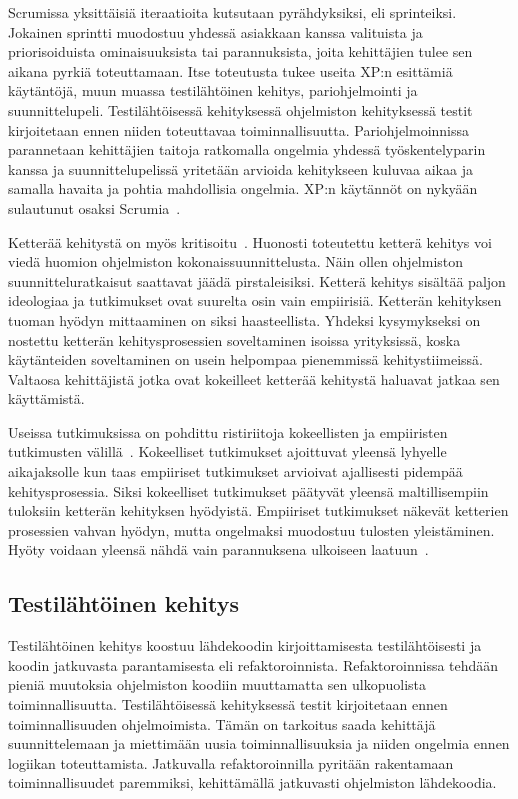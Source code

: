 \documentclass[finnish]{../tktltiki2}
\theoremstyle{definition}
\theoremstyle{remark}
\begin{document}
    Scrumissa yksittäisiä iteraatioita kutsutaan pyrähdyksiksi, eli sprinteiksi. Jokainen sprintti muodostuu yhdessä 
asiakkaan kanssa valituista ja priorisoiduista ominaisuuksista tai parannuksista, joita kehittäjien tulee sen aikana 
pyrkiä toteuttamaan. Itse toteutusta tukee useita XP:n esittämiä käytäntöjä, muun muassa testilähtöinen kehitys, 
pariohjelmointi ja suunnittelupeli. Testilähtöisessä kehityksessä ohjelmiston kehityksessä testit kirjoitetaan ennen 
niiden toteuttavaa toiminnallisuutta. Pariohjelmoinnissa parannetaan kehittäjien taitoja ratkomalla ongelmia yhdessä 
työskentelyparin kanssa ja suunnittelupelissä yritetään arvioida kehitykseen kuluvaa aikaa ja samalla havaita ja pohtia 
mahdollisia ongelmia. XP:n käytännöt on nykyään sulautunut osaksi Scrumia~\cite{Kn07}.

    Ketterää kehitystä on myös kritisoitu~\cite{DD08}. Huonosti toteutettu ketterä kehitys voi viedä huomion ohjelmiston 
kokonaissuunnittelusta. Näin ollen ohjelmiston suunnitteluratkaisut saattavat jäädä pirstaleisiksi. Ketterä kehitys 
sisältää paljon ideologiaa ja tutkimukset ovat suurelta osin vain empiirisiä. Ketterän kehityksen tuoman hyödyn 
mittaaminen on siksi haasteellista. Yhdeksi kysymykseksi on nostettu ketterän kehitysprosessien soveltaminen isoissa 
yrityksissä, koska käytänteiden soveltaminen on usein helpompaa pienemmissä kehitystiimeissä. Valtaosa kehittäjistä 
jotka ovat kokeilleet ketterää kehitystä haluavat jatkaa sen käyttämistä.

    Useissa tutkimuksissa on pohdittu ristiriitoja kokeellisten ja empiiristen tutkimusten välillä~\cite{DD08, SS10}. 
Kokeelliset tutkimukset ajoittuvat yleensä lyhyelle aikajaksolle kun taas empiiriset tutkimukset arvioivat ajallisesti 
pidempää kehitysprosessia. Siksi kokeelliset tutkimukset päätyvät yleensä maltillisempiin tuloksiin ketterän kehityksen 
hyödyistä. Empiiriset tutkimukset näkevät ketterien prosessien vahvan hyödyn, mutta ongelmaksi muodostuu tulosten 
yleistäminen. Hyöty voidaan yleensä nähdä vain parannuksena ulkoiseen laatuun~\cite{SS10}.

\subsection{Testilähtöinen kehitys}

Testilähtöinen kehitys koostuu lähdekoodin kirjoittamisesta testilähtöisesti ja koodin jatkuvasta parantamisesta eli 
refaktoroinnista. Refaktoroinnissa tehdään pieniä muutoksia ohjelmiston koodiin muuttamatta sen ulkopuolista 
toiminnallisuutta. Testilähtöisessä kehityksessä testit kirjoitetaan ennen toiminnallisuuden ohjelmoimista. Tämän on 
tarkoitus saada kehittäjä suunnittelemaan ja miettimään uusia toiminnallisuuksia ja niiden ongelmia ennen logiikan 
toteuttamista. Jatkuvalla refaktoroinnilla pyritään rakentamaan toiminnallisuudet paremmiksi, kehittämällä jatkuvasti 
ohjelmiston lähdekoodia.
\end{document}
